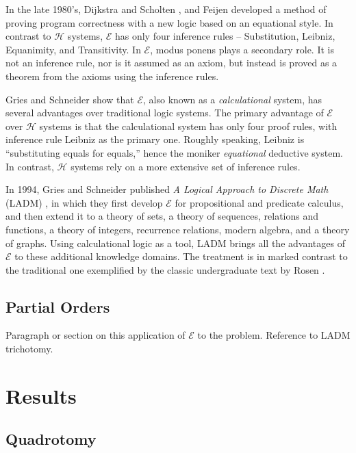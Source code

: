 \documentclass[12pt, fleqn, leqno]{article}
\begin{document}
In the late 1980's, Dijkstra and Scholten \cite{DandS}, and Feijen \cite{Feij} developed a method of proving program correctness with a new logic based on an equational style.
In contrast to $\mathcal{H}$ systems, $\mathcal{E}$ has only four inference rules -- Substitution, Leibniz, Equanimity, and Transitivity.
In $\mathcal{E}$, modus ponens plays a secondary role.
It is not an inference rule, nor is it assumed as an axiom, but instead is proved as a theorem from the axioms using the inference rules.

Gries and Schneider \cite{Gries1995, Gries1995145} show that $\mathcal{E}$, also known as a \textit{calculational} system, has several advantages over traditional logic systems.
The primary advantage of $\mathcal{E}$ over $\mathcal{H}$ systems is that the calculational system has only four proof rules, with inference rule Leibniz as the primary one.
Roughly speaking, Leibniz is ``substituting equals for equals,'' hence the moniker \textit{equational} deductive system.
In contrast, $\mathcal{H}$ systems rely on a more extensive set of inference rules.

In 1994, Gries and Schneider published \textit{A Logical Approach to Discrete Math} (LADM) \cite{LADM}, in which they first develop $\mathcal{E}$ for propositional and predicate calculus, and then extend it to a theory of sets, a theory of sequences, relations and functions, a theory of integers, recurrence relations, modern algebra, and a theory of graphs.
Using calculational logic as a tool, LADM brings all the advantages of $\mathcal{E}$ to these additional knowledge domains.
The treatment is in marked contrast to the traditional one exemplified by the classic undergraduate text by Rosen \cite{Rosen}.

\subsection{Partial Orders}

Paragraph or section on this application of $\mathcal{E}$ to the problem.
Reference to LADM trichotomy.

\section{Results}

\subsection{Quadrotomy}
\end{document}
